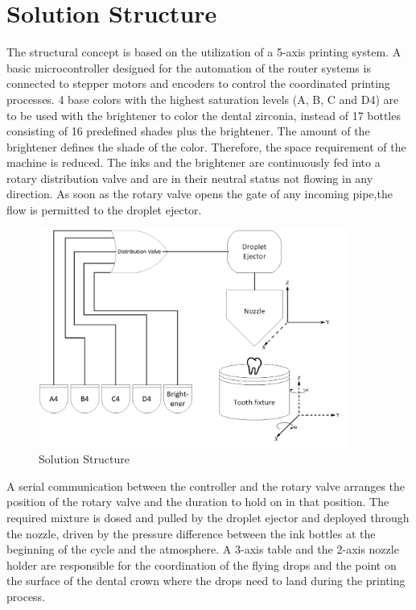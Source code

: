 \chapter{Solution Structure}
The structural concept is based on the utilization of a 5-axis printing system. A basic microcontroller designed for the automation of the router systems is connected to stepper motors and encoders to control the coordinated printing processes. 4 base colors with the highest saturation levels (A, B, C and D4) are to be used with the brightener to color the dental zirconia, instead of 17 bottles consisting of 16 predefined shades plus the brightener. The amount of the brightener defines the shade of the color. Therefore, the space requirement of the machine is reduced. The inks and the brightener are continuously fed into a rotary distribution valve and are in their neutral status not flowing in any direction. As soon as the rotary valve opens the gate of any incoming pipe,the flow is permitted to the droplet ejector.  

\bigskip

\begin{figure}[H]
	\centering
	\includegraphics[width=0.9\textwidth]{grafiken/SolutionStructure.jpg}
	\caption{Solution Structure}
	\label{fig:SolutionStructure}
\end{figure} 

\bigskip

A serial communication between the controller and the rotary valve arranges the position of the rotary valve and the duration to hold on in that position. The required mixture is dosed and pulled by the droplet ejector and deployed through the nozzle, driven by the pressure difference between the ink bottles at the beginning of the cycle and the atmosphere. A 3-axis table and the 2-axis nozzle holder are responsible for the coordination of the flying drops and the point on the surface of the dental crown where the drops need to land during the printing process.

